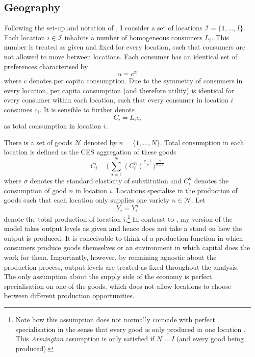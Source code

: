 \documentclass[11pt, oneside]{article}   	%
\begin{document}
\subsection{Geography}

Following the set-up and notation of \cite{fajgelbaum_optimal_2017}, I consider a set of locations $\mathcal{I} =\{ 1,...,I\}$. Each location $i \in \mathcal{I}$ inhabits a number of homogeneous consumers $L_{i}$. This number is treated as given and fixed for every location, such that consumers are not allowed to move between locations. Each consumer has an identical set of preferences characterised by
\begin{equation*}
  u = c^{\alpha}
\end{equation*}
where $c$ denotes per capita consumption. Due to the symmetry of consumers in every location, per capita consumption (and therefore utility) is identical for every consumer within each location, such that every consumer in location $i$ consumes $c_{i}$. It is sensible to further denote
\begin{equation*}
  C_{i} = L_{i}c_{i}
\end{equation*}
as total consumption in location $i$.

There is a set of goods $\mathcal{N}$ denoted by $n =\{ 1,...,N\}$. Total consumption in each location is defined as the CES aggregation of these goods
\begin{equation*}
  C_{i} = \bigg( \sum_{n=1}^{N} (C_{i}^{n})^{\frac{\sigma-1}{\sigma}}\bigg)^{\frac{\sigma}{\sigma-1}}
\end{equation*}
where $\sigma$ denotes the standard elasticity of substitution and $C_{i}^{n}$ denotes the consumption of good $n$ in location $i$. Locations specialise in the production of goods such that each location only supplies one variety $n \in \mathcal{N}$. Let
\begin{equation*}
  Y_{i} = Y_{i}^{n}
\end{equation*}
denote the total production of location $i$.\footnote{Note how this assumption does not normally coincide with perfect specialisation in the sense that every good is only produced in one location \citep[as in e.g.][]{Anderson_Gravitygravitassolution_2003}. This \emph{Armington} assumption is only satisfied if $N=I$ (and every good being produced).} In contrast to \citeauthor{fajgelbaum_optimal_2017}, my version of the model takes output levels as given and hence does not take a stand on how the output is produced. It is conceivable to think of a production function in which consumers produce goods themselves or an environment in which capital does the work for them. Importantly, however, by remaining agnostic about the production process, output levels are treated as fixed throughout the analysis. The only assumption about the supply side of the economy is perfect specialisation on one of the goods, which does not allow locations to choose between different production opportunities.
\end{document}
